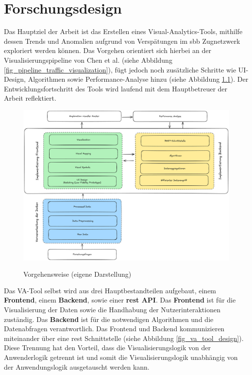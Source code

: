 \chapter{Forschungsdesign}
\label{kap:forschungsdesign}
Das Hauptziel der Arbeit ist das Erstellen eines Visual-Analytics-Tools, mithilfe dessen Trends und Anomalien aufgrund von Verspätungen im \acrshort{sbb} Zugnetzwerk exploriert werden können. Das Vorgehen orientiert sich hierbei an der Visualisierungspipeline von Chen et al. (siehe Abbildung \ref{fig_pipeline_traffic_visualization}), fügt jedoch noch zusätzliche Schritte wie UI-Design, Algorithmen sowie Performance-Analyse hinzu (siehe Abbildung \ref{fig_vorgehen}). Der Entwicklungsfortschritt des Tools wird laufend mit dem Hauptbetreuer der Arbeit reflektiert.

\begin{figure}[H]
    \caption{Vorgehensweise (eigene Darstellung)}
    \includegraphics[width=.8\linewidth]{content/00_assets/vorgehen.png}
    \label{fig_vorgehen}
\end{figure}


Das VA-Tool selbst wird aus drei Hauptbestandteilen aufgebaut, einem \textbf{Frontend}, einem \textbf{Backend}, sowie einer \textbf{\acrfull{rest} API}. Das \textbf{Frontend} ist für die Visualisierung der Daten sowie die Handhabung der Nutzerinteraktionen zuständig. Das \textbf{Backend} ist für die notwendigen Algorithmen und die Datenabfragen verantwortlich. Das Frontend und Backend kommunizieren miteinander über eine  \acrshort{rest} Schnittstelle (siehe Abbildung \ref{fig_va_tool_design}). Diese Trennung hat den Vorteil, dass die Visualisierungslogik von der Anwenderlogik getrennt ist und somit die Visualisierungslogik unabhängig von der Anwendungslogik ausgetauscht werden kann.

